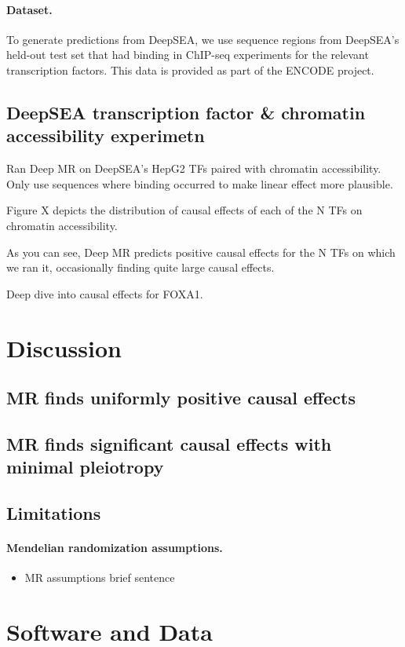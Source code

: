 \documentclass{article}
\begin{document}
\paragraph{Dataset.}
To generate predictions from DeepSEA, we use sequence regions from DeepSEA's held-out test set that had binding in ChIP-seq experiments for the relevant transcription factors. This data is provided as part of the ENCODE project. 

\subsection{DeepSEA transcription factor \& chromatin accessibility experimetn}
Ran Deep MR on DeepSEA's HepG2 TFs paired with chromatin accessibility.
Only use sequences where binding occurred to make linear effect more plausible.

Figure X depicts the distribution of causal effects of each of the N TFs on chromatin accessibility.

As you can see, Deep MR predicts positive causal effects for the N TFs on which we ran it, occasionally finding quite large causal effects.

Deep dive into causal effects for FOXA1. 

\section{Discussion}
\subsection{MR finds uniformly positive causal effects}

\subsection{MR finds significant causal effects with minimal pleiotropy}



\subsection{Limitations}
\paragraph{Mendelian randomization assumptions.}

\begin{itemize}
    \item MR assumptions brief sentence
\end{itemize}

\section*{Software and Data}



\end{document}
